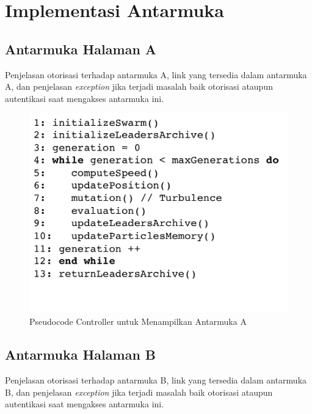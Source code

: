 \section{Implementasi Antarmuka}
	
    \subsection{Antarmuka Halaman A}
    Penjelasan otorisasi terhadap antarmuka A, link yang tersedia dalam antarmuka A, dan penjelasan \textit{exception} jika terjadi masalah baik otorisasi ataupun autentikasi saat mengakses antarmuka ini.
  
      \begin{figure}[H]
        \centering
        \includegraphics[width=\linewidth]{images/bab4/smpso_code.png}
        \caption{ Pseudocode Controller untuk Menampilkan Antarmuka A }
        \label{pdm}
      \end{figure}
      
    \subsection{Antarmuka Halaman B}
    Penjelasan otorisasi terhadap antarmuka B, link yang tersedia dalam antarmuka B, dan penjelasan \textit{exception} jika terjadi masalah baik otorisasi ataupun autentikasi saat mengakses antarmuka ini.
  
